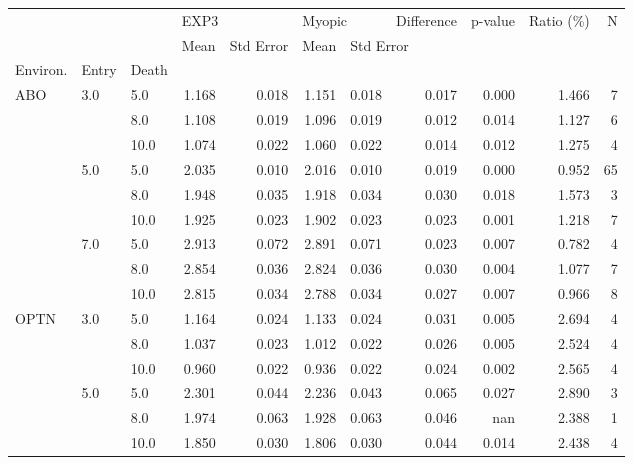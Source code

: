 \begin{tabular}{lllrrrrrrrr}
\toprule
    &     &      & \multicolumn{2}{l}{EXP3} & \multicolumn{2}{l}{Myopic} & Difference & p-value & Ratio (\%) &   N \\
    &     &      &  Mean & Std Error &   Mean & \multicolumn{5}{l}{Std Error} \\
Environ. & Entry & Death &       &           &        &           &            &         &           &     \\
\midrule
ABO & 3.0 & 5.0  & 1.168 &     0.018 &  1.151 &     0.018 &      0.017 &   0.000 &     1.466 &   7 \\
    &     & 8.0  & 1.108 &     0.019 &  1.096 &     0.019 &      0.012 &   0.014 &     1.127 &   6 \\
    &     & 10.0 & 1.074 &     0.022 &  1.060 &     0.022 &      0.014 &   0.012 &     1.275 &   4 \\
    & 5.0 & 5.0  & 2.035 &     0.010 &  2.016 &     0.010 &      0.019 &   0.000 &     0.952 &  65 \\
    &     & 8.0  & 1.948 &     0.035 &  1.918 &     0.034 &      0.030 &   0.018 &     1.573 &   3 \\
    &     & 10.0 & 1.925 &     0.023 &  1.902 &     0.023 &      0.023 &   0.001 &     1.218 &   7 \\
    & 7.0 & 5.0  & 2.913 &     0.072 &  2.891 &     0.071 &      0.023 &   0.007 &     0.782 &   4 \\
    &     & 8.0  & 2.854 &     0.036 &  2.824 &     0.036 &      0.030 &   0.004 &     1.077 &   7 \\
    &     & 10.0 & 2.815 &     0.034 &  2.788 &     0.034 &      0.027 &   0.007 &     0.966 &   8 \\
OPTN & 3.0 & 5.0  & 1.164 &     0.024 &  1.133 &     0.024 &      0.031 &   0.005 &     2.694 &   4 \\
    &     & 8.0  & 1.037 &     0.023 &  1.012 &     0.022 &      0.026 &   0.005 &     2.524 &   4 \\
    &     & 10.0 & 0.960 &     0.022 &  0.936 &     0.022 &      0.024 &   0.002 &     2.565 &   4 \\
    & 5.0 & 5.0  & 2.301 &     0.044 &  2.236 &     0.043 &      0.065 &   0.027 &     2.890 &   3 \\
    &     & 8.0  & 1.974 &     0.063 &  1.928 &     0.063 &      0.046 &     nan &     2.388 &   1 \\
    &     & 10.0 & 1.850 &     0.030 &  1.806 &     0.030 &      0.044 &   0.014 &     2.438 &   4 \\

\end{tabular}
